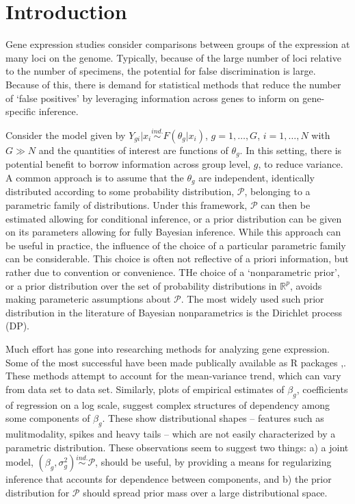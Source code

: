 \newcommand{\ind}{\stackrel{ind.}{\sim}}
\newcommand{\op}{\operatorname}
\newcommand{\code}{\texttt}

\section{Introduction}
Gene expression studies consider comparisons between groups of the expression at many loci on the genome. Typically, because of the large number of loci relative to the number of specimens, the potential for false discrimination is large. Because of this, there is demand for statistical methods that reduce the number of `false positives' by leveraging information across genes to inform on gene-specific inference.

Consider the model given by $Y_{gi}|x_i \ind F(\theta_{g}| x_i)$, $g=1,\ldots,G$, $i=1,\ldots,N$ with $G\gg N$ and the quantities of interest are functions of $\theta_g$. In this setting, there is potential benefit to borrow information across group level, $g$, to reduce variance. A common approach is to assume that the $\theta_g$ are independent, identically distributed according to some probability distribution, $\mathcal{P}$, belonging to a parametric family of distributions. Under this framework, $\mathcal{P}$ can then be estimated allowing for conditional inference, or a prior distribution can be given on its parameters allowing for fully Bayesian inference. While this approach can be useful in practice, the influence of the choice of a particular parametric family can be considerable. This choice is often not reflective of a priori information, but rather due to convention or convenience. THe choice of a `nonparametric prior', or a prior distribution over the set of probability distributions in $\mathbb{R}^p$, avoids making parameteric assumptions about $\mathcal{P}$. The most widely used such prior distribution in the literature of Bayesian nonparametrics is the Dirichlet process (DP).

Much effort has gone into researching methods for analyzing gene expression. Some of the most successful have been made publically available as R packages \cite{edger2010},\cite{deseq2014}. These methods attempt to account for the mean-variance trend, which can vary from data set to data set. Similarly, plots of empirical estimates of $\beta_g$, coefficients of regression on a log scale, suggest complex structures of dependency among some components of $\beta_g$. These show distributional shapes -- features such as mulitmodality, spikes and heavy tails -- which are not easily characterized by a parametric distribution. These observations seem to suggest two things: a) a joint model, $(\beta_g, \sigma^2_g) \ind \mathcal{P}$, should be useful, by providing a means for regularizing inference that accounts for dependence between components, and b) the prior distribution for $\mathcal{P}$ should spread prior mass over a large distributional space.

